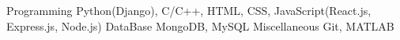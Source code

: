 

\begin{cvskills}

  \cvskill
    {Programming} %
    {Python(Django), C/C++, HTML, CSS, JavaScript(React.js, Express.js, Node.js)} %
  \cvskill
    {DataBase} %
    {MongoDB, MySQL} %
  \cvskill
    {Miscellaneous} %
    {Git, MATLAB} %
\\
\\
\end{cvskills}
